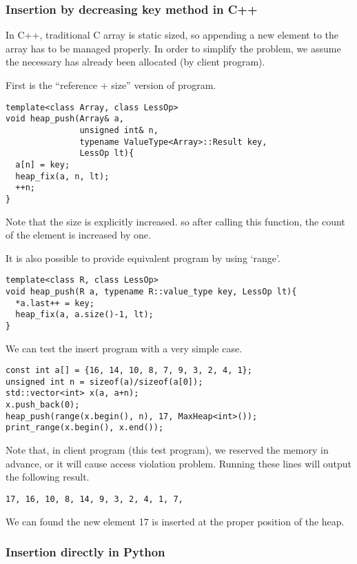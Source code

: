 \documentclass{article}
\begin{document}
\subsubsection*{Insertion by decreasing key method in C++}
In C++, traditional C array is static sized, so appending a new element
to the array has to be managed properly. In order to simplify the
problem, we assume the necessary has already been allocated (by
client program).

First is the ``reference + size'' version of program.

\lstset{language=C++}
\begin{lstlisting}
template<class Array, class LessOp>
void heap_push(Array& a,
               unsigned int& n,
               typename ValueType<Array>::Result key,
               LessOp lt){
  a[n] = key;
  heap_fix(a, n, lt);
  ++n;
}
\end{lstlisting}

Note that the size is explicitly increased. so after calling this
function, the count of the element is increased by one.

It is also possible to provide equivalent program by using `range'.

\begin{lstlisting}
template<class R, class LessOp>
void heap_push(R a, typename R::value_type key, LessOp lt){
  *a.last++ = key;
  heap_fix(a, a.size()-1, lt);
}
\end{lstlisting}

We can test the insert program with a very simple case.

\begin{lstlisting}
const int a[] = {16, 14, 10, 8, 7, 9, 3, 2, 4, 1};
unsigned int n = sizeof(a)/sizeof(a[0]);
std::vector<int> x(a, a+n);
x.push_back(0);
heap_push(range(x.begin(), n), 17, MaxHeap<int>());
print_range(x.begin(), x.end());
\end{lstlisting}

Note that, in client program (this test program), we
reserved the memory in advance, or it will cause
access violation problem.
Running these lines will output the following result.

\begin{verbatim}
17, 16, 10, 8, 14, 9, 3, 2, 4, 1, 7,
\end{verbatim}

We can found the new element 17 is inserted at the proper
position of the heap.

\subsubsection*{Insertion directly in Python}
\end{document}
